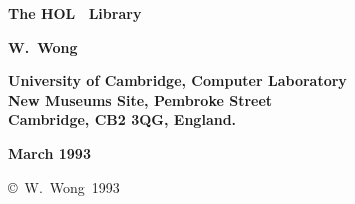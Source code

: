 
\begin{titlepage}

\setcounter{page}{1}		          %


\mbox{}
\vskip20mm
\begin{center}
{\Huge\bf The HOL \resquan\ Library}
\end{center}


\vskip15mm
\begin{center}
\large\bf W.\ Wong
\end{center}


\vfill
\begin{center}
\bf
University of Cambridge, Computer Laboratory\\
New Museums Site, Pembroke Street\\
Cambridge, {\small\bf CB}2 3{\small\bf QG}, England.
\end{center}


\vskip5mm
\begin{center}
\bf March 1993
\end{center}

\end{titlepage}

\thispagestyle{empty}
\mbox{}

\vfill
\begin{center}
\copyright\ W.\ Wong\ 1993
\end{center}
\newpage
